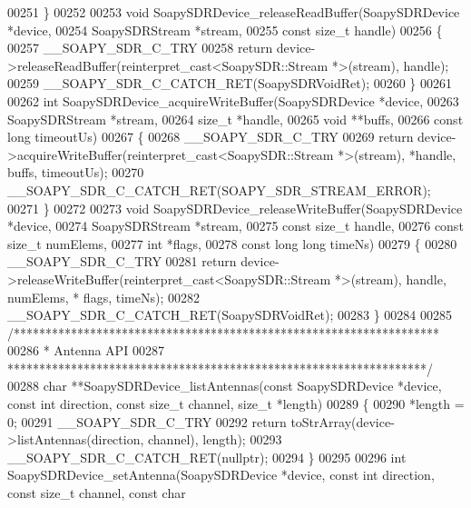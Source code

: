 \begin{DoxyCode}
00251 \}
00252 
00253 \textcolor{keywordtype}{void} SoapySDRDevice_releaseReadBuffer(SoapySDRDevice *device,
00254     SoapySDRStream *stream,
00255     \textcolor{keyword}{const} \textcolor{keywordtype}{size\_t} handle)
00256 \{
00257     __SOAPY_SDR_C_TRY
00258     \textcolor{keywordflow}{return} device->releaseReadBuffer(reinterpret\_cast<SoapySDR::Stream *>(stream), handle);
00259     __SOAPY_SDR_C_CATCH_RET(SoapySDRVoidRet);
00260 \}
00261 
00262 \textcolor{keywordtype}{int} SoapySDRDevice_acquireWriteBuffer(SoapySDRDevice *device,
00263     SoapySDRStream *stream,
00264     \textcolor{keywordtype}{size\_t} *handle,
00265     \textcolor{keywordtype}{void} **buffs,
00266     \textcolor{keyword}{const} \textcolor{keywordtype}{long} timeoutUs)
00267 \{
00268     __SOAPY_SDR_C_TRY
00269     \textcolor{keywordflow}{return} device->acquireWriteBuffer(reinterpret\_cast<SoapySDR::Stream *>(stream), *handle, buffs, 
      timeoutUs);
00270     __SOAPY_SDR_C_CATCH_RET(SOAPY_SDR_STREAM_ERROR);
00271 \}
00272 
00273 \textcolor{keywordtype}{void} SoapySDRDevice_releaseWriteBuffer(SoapySDRDevice *device,
00274     SoapySDRStream *stream,
00275     \textcolor{keyword}{const} \textcolor{keywordtype}{size\_t} handle,
00276     \textcolor{keyword}{const} \textcolor{keywordtype}{size\_t} numElems,
00277     \textcolor{keywordtype}{int} *flags,
00278     \textcolor{keyword}{const} \textcolor{keywordtype}{long} \textcolor{keywordtype}{long} timeNs)
00279 \{
00280     __SOAPY_SDR_C_TRY
00281     \textcolor{keywordflow}{return} device->releaseWriteBuffer(reinterpret\_cast<SoapySDR::Stream *>(stream), handle, numElems, *
      flags, timeNs);
00282     __SOAPY_SDR_C_CATCH_RET(SoapySDRVoidRet);
00283 \}
00284 
00285 \textcolor{comment}{/*******************************************************************}
00286 \textcolor{comment}{ * Antenna API}
00287 \textcolor{comment}{ ******************************************************************/}
00288 \textcolor{keywordtype}{char} **SoapySDRDevice_listAntennas(\textcolor{keyword}{const} SoapySDRDevice *device, \textcolor{keyword}{const} \textcolor{keywordtype}{int} direction, \textcolor{keyword}{const} \textcolor{keywordtype}{size\_t} channel,
       \textcolor{keywordtype}{size\_t} *length)
00289 \{
00290     *length = 0;
00291     __SOAPY_SDR_C_TRY
00292     \textcolor{keywordflow}{return} toStrArray(device->listAntennas(direction, channel), length);
00293     __SOAPY_SDR_C_CATCH_RET(\textcolor{keyword}{nullptr});
00294 \}
00295 
00296 \textcolor{keywordtype}{int} SoapySDRDevice_setAntenna(SoapySDRDevice *device, \textcolor{keyword}{const} \textcolor{keywordtype}{int} direction, \textcolor{keyword}{const} \textcolor{keywordtype}{size\_t} channel, \textcolor{keyword}{const} \textcolor{keywordtype}{char}

\end{DoxyCode}
